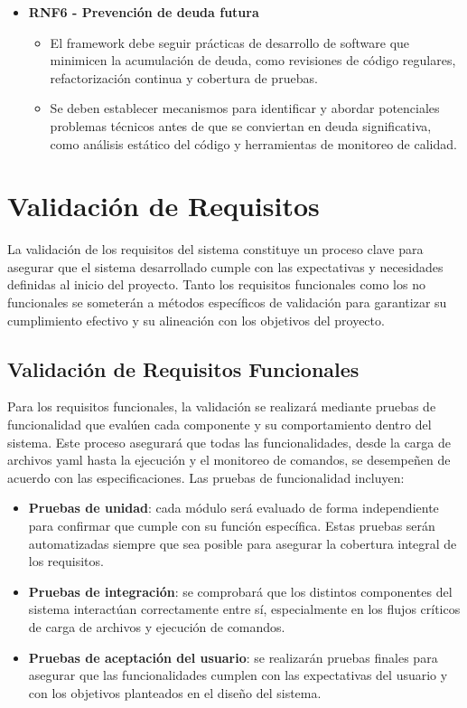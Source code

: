 \begin{itemize}
    \item \textbf{RNF6 - Prevención de \Gls{deuda} futura}
          \begin{itemize}
              \item El \gls{framework} debe seguir prácticas de desarrollo de software que minimicen la acumulación de \Gls{deuda}, como revisiones de código regulares, refactorización continua y cobertura de pruebas.
              \item Se deben establecer mecanismos para identificar y abordar potenciales problemas técnicos antes de que se conviertan en \Gls{deuda} significativa, como análisis estático del código y herramientas de monitoreo de calidad.
          \end{itemize}
\end{itemize}

\section{Validación de Requisitos}

La validación de los requisitos del sistema constituye un proceso clave para asegurar que el sistema desarrollado cumple con las expectativas y necesidades definidas al inicio del proyecto. Tanto los requisitos funcionales como los no funcionales se someterán a métodos específicos de validación para garantizar su cumplimiento efectivo y su alineación con los objetivos del proyecto.

\subsection{Validación de Requisitos Funcionales}
Para los requisitos funcionales, la validación se realizará mediante pruebas de funcionalidad que evalúen cada componente y su comportamiento dentro del sistema. Este proceso asegurará que todas las funcionalidades, desde la carga de archivos \acrshort{yaml} hasta la ejecución y el monitoreo de comandos, se desempeñen de acuerdo con las especificaciones. Las pruebas de funcionalidad incluyen:
\begin{itemize}
    \item \textbf{Pruebas de unidad}: cada módulo será evaluado de forma independiente para confirmar que cumple con su función específica. Estas pruebas serán automatizadas siempre que sea posible para asegurar la cobertura integral de los requisitos.
    \item \textbf{Pruebas de integración}: se comprobará que los distintos componentes del sistema interactúan correctamente entre sí, especialmente en los flujos críticos de carga de archivos y ejecución de comandos.
    \item \textbf{Pruebas de aceptación del usuario}: se realizarán pruebas finales para asegurar que las funcionalidades cumplen con las expectativas del usuario y con los objetivos planteados en el diseño del sistema.
\end{itemize}

